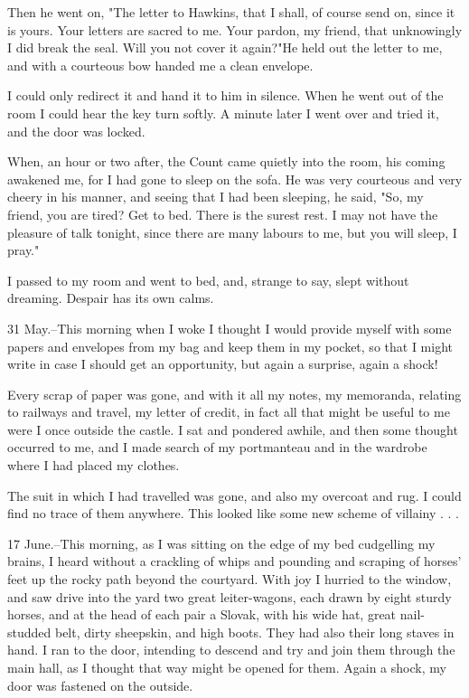 Then he went on, "The letter to Hawkins, that I shall, of course send on, since it is yours. Your letters are sacred to me. Your pardon, my friend, that unknowingly I did break the seal. Will you not cover it again?"He held out the letter to me, and with a courteous bow handed me a clean envelope. 

I could only redirect it and hand it to him in silence. When he went out of the room I could hear the key turn softly. A minute later I went over and tried it, and the door was locked. 

When, an hour or two after, the Count came quietly into the room, his coming awakened me, for I had gone to sleep on the sofa. He was very courteous and very cheery in his manner, and seeing that I had been sleeping, he said, "So, my friend, you are tired? Get to bed. There is the surest rest. I may not have the pleasure of talk tonight, since there are many labours to me, but you will sleep, I pray." 

I passed to my room and went to bed, and, strange to say, slept without dreaming. Despair has its own calms. 

31 May.--This morning when I woke I thought I would provide myself with some papers and envelopes from my bag and keep them in my pocket, so that I might write in case I should get an opportunity, but again a surprise, again a shock! 

Every scrap of paper was gone, and with it all my notes, my memoranda, relating to railways and travel, my letter of credit, in fact all that might be useful to me were I once outside the castle. I sat and pondered awhile, and then some thought occurred to me, and I made search of my portmanteau and in the wardrobe where I had placed my clothes. 

The suit in which I had travelled was gone, and also my overcoat and rug. I could find no trace of them anywhere. This looked like some new scheme of villainy . . . 

17 June.--This morning, as I was sitting on the edge of my bed cudgelling my brains, I heard without a crackling of whips and pounding and scraping of horses' feet up the rocky path beyond the courtyard. With joy I hurried to the window, and saw drive into the yard two great leiter-wagons, each drawn by eight sturdy horses, and at the head of each pair a Slovak, with his wide hat, great nail-studded belt, dirty sheepskin, and high boots. They had also their long staves in hand. I ran to the door, intending to descend and try and join them through the main hall, as I thought that way might be opened for them. Again a shock, my door was fastened on the outside. 

